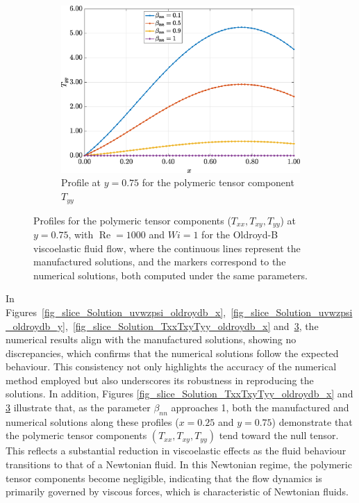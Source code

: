 \documentclass[preprint, 12pt]{elsarticle}
\begin{document}
\begin{figure}[H]
\begin{subfigure}[b]{.46\textwidth}
        \label{fig_slice_y_txy_2nd_Case1_oldorydb}
    \end{subfigure}
    \begin{subfigure}[b]{.46\textwidth}
        \includegraphics[width=\textwidth]{Slice_y_Tog_Numerical_NormErr_2nd_Betann_1_Re_1000_Wi_1_epsilon_0_xi_0_alphaG_0_Dt_1e-06_at_0.05_tipsim_1_MMS_12_x0.75y0.75_Tyy.eps}
        \caption{Profile at $y=0.75$ for the polymeric tensor component $T_{yy}$}
        \label{fig_slice_y_tyy_2nd_Case1_oldorydb}
    \end{subfigure}
    \vspace{0.02cm}
    \caption{Profiles for the polymeric tensor components ($T_{xx}, T_{xy}, T_{yy}$) at $y=0.75$, with $\operatorname{Re}=1000$ and $Wi=1$ for the Oldroyd-B viscoelastic fluid flow, where the continuous lines represent the manufactured solutions, and the markers correspond to the numerical solutions, both computed under the same parameters.\label{fig_slice_Solution_TxxTxyTyy_oldroydb_y}}
\end{figure}

In Figures~\ref{fig_slice_Solution_uvwzpsi_oldroydb_x},~\ref{fig_slice_Solution_uvwzpsi_oldroydb_y},~\ref{fig_slice_Solution_TxxTxyTyy_oldroydb_x} and~\ref{fig_slice_Solution_TxxTxyTyy_oldroydb_y}, the numerical results align with the manufactured solutions, showing no discrepancies, which confirms that the numerical solutions follow the expected behaviour. This consistency not only highlights the accuracy of the numerical method employed but also underscores its robustness in reproducing the solutions. In addition, Figures \ref{fig_slice_Solution_TxxTxyTyy_oldroydb_x} and \ref{fig_slice_Solution_TxxTxyTyy_oldroydb_y} illustrate that, as the parameter $\beta_{nn}$ approaches 1, both the manufactured and numerical solutions along these profiles ($x=0.25$ and $y=0.75$) demonstrate that the polymeric tensor components $(T_{xx}, T_{xy}, T_{yy})$ tend toward the null tensor. This reflects a substantial reduction in viscoelastic effects as the fluid behaviour transitions to that of a Newtonian fluid. In this Newtonian regime, the polymeric tensor components become negligible, indicating that the flow dynamics is primarily governed by viscous forces, which is characteristic of Newtonian fluids.
\end{document}

